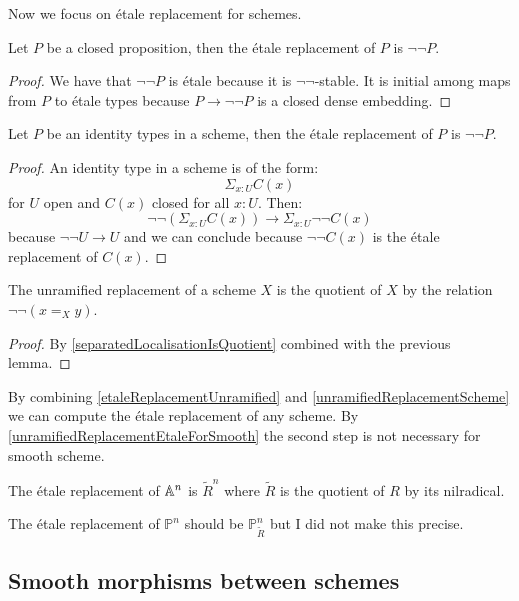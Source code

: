 Now we focus on étale replacement for schemes.

\begin{lemma}
Let $P$ be a closed proposition, then the étale replacement of $P$ is $\neg\neg P$.
\end{lemma}

\begin{proof}
We have that $\neg\neg P$ is étale because it is $\neg\neg$-stable. It is initial among maps from $P$ to étale types because $P\to \neg\neg P$ is a closed dense embedding.
\end{proof}

\begin{lemma}
Let $P$ be an identity types in a scheme, then the étale replacement of $P$ is $\neg\neg P$.
\end{lemma}

\begin{proof}
An identity type in a scheme is of the form:
\[\Sigma_{x:U}C(x)\]
for $U$ open and $C(x)$ closed for all $x:U$. Then:
\[\neg\neg(\Sigma_{x:U}C(x)) \to \Sigma_{x:U}\neg\neg C(x)\]
because $\neg\neg U \to U$ and we can conclude because $\neg\neg C(x)$ is the étale replacement of $C(x)$.
\end{proof}

\begin{corollary}
\label{unramifiedReplacementScheme}
The unramified replacement of a scheme $X$ is the quotient of $X$ by the relation $\neg\neg(x=_Xy)$.
\end{corollary} 

\begin{proof}
By \cref{separatedLocalisationIsQuotient} combined with the previous lemma.
\end{proof}

By combining \cref{etaleReplacementUnramified} and \cref{unramifiedReplacementScheme} we can compute the étale replacement of any scheme. By \cref{unramifiedReplacementEtaleForSmooth} the second step is not necessary for smooth scheme. 

\begin{example}
The étale replacement of $\mathbb{A}^n$ is $\tilde{R}^n$ where $\tilde{R}$ is the quotient of $R$ by its nilradical.
\end{example}

The étale replacement of $\mathbb{P}^n$ should be $\mathbb{P}_{\tilde{R}}^n$ but I did not make this precise.

\subsection{Smooth morphisms between schemes}

